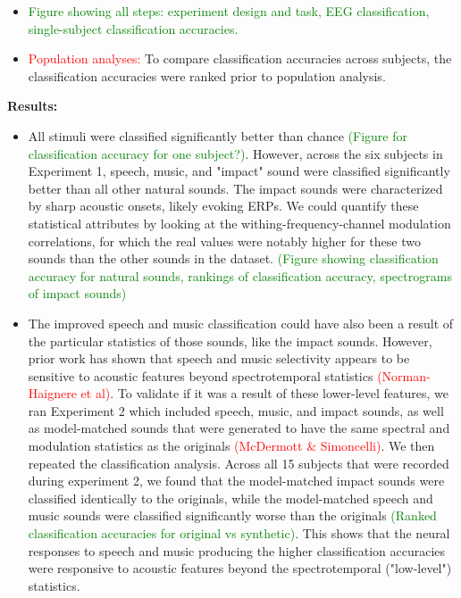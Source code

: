 \documentclass[11pt]{article}
\begin{document}
\begin{itemize}
\item \textcolor{green}{Figure showing all steps: experiment design and task, EEG classification, single-subject classification accuracies.}
\item \textcolor{red}{Population analyses:} To compare classification accuracies across subjects, the classification accuracies were ranked prior to population analysis.
\end{itemize}

\textbf{Results:}

\begin{itemize}
\item All stimuli were classified significantly better than chance \textcolor{green}{(Figure for classification accuracy for one subject?)}.  However, across the six subjects in Experiment 1, speech, music, and "impact" sound were classified significantly better than all other natural sounds.  The impact sounds were characterized by sharp acoustic onsets, likely evoking ERPs.  We could quantify these statistical attributes by looking at the withing-frequency-channel modulation correlations, for which the real values were notably higher for these two sounds than the other sounds in the dataset. \textcolor{green}{(Figure showing classification accuracy for natural sounds, rankings of classification accuracy, spectrograms of impact sounds)}
\item The improved speech and music classification could have also been a result of the particular statistics of those sounds, like the impact sounds.  However, prior work has shown that speech and music selectivity appears to be sensitive to acoustic features beyond spectrotemporal statistics \textcolor{red}{(Norman-Haignere et al)}.  To validate if it was a result of these lower-level features, we ran Experiment 2 which included speech, music, and impact sounds, as well as model-matched sounds that were generated to have the same spectral and modulation statistics as the originals \textcolor{red}{(McDermott \& Simoncelli)}.  We then repeated the classification analysis.  Across all 15 subjects that were recorded during experiment 2, we found that the model-matched impact sounds were classified identically to the originals, while the model-matched speech and music sounds were classified significantly worse than the originals \textcolor{green}{(Ranked classification accuracies for original vs synthetic)}.  This shows that the neural responses to speech and music producing the higher classification accuracies were responsive to acoustic features beyond the spectrotemporal ("low-level") statistics.

\end{itemize}
\end{document}
